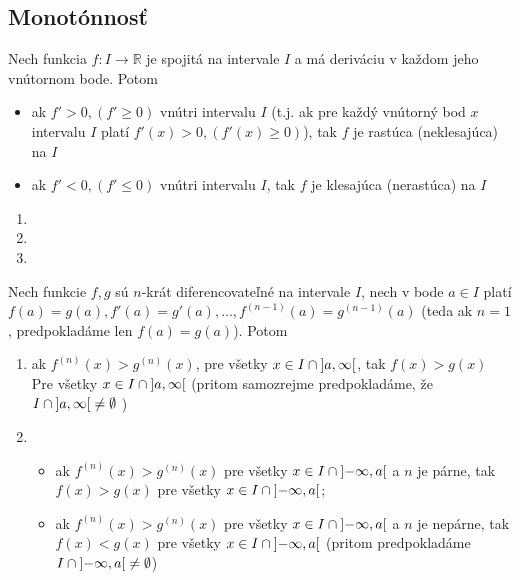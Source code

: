\subsection{Monotónnosť}
\begin{veta}
Nech funkcia $f: I \rightarrow\mathbb{R}$ je spojitá na intervale $I$ a má
deriváciu v každom jeho vnútornom bode. Potom
\begin{itemize}
\item
  ak $f'>0,(f'\geq 0)$ vnútri intervalu $I$ (t.j. ak pre každý vnútorný bod
  $x$ intervalu $I$ platí $f'(x)>0,(f'(x)\geq 0)$), tak $f$ je rastúca
  (neklesajúca) na $I$
\item
  ak $f'<0,(f'\leq 0)$ vnútri intervalu $I$, tak $f$ je klesajúca (nerastúca) na
  $I$
\end{itemize}
\end{veta}

\begin{enumerate}[resume]
  \item {}
  \item {}
  \item {}
\end{enumerate}

\begin{veta}
Nech funkcie $f,g$ sú $n$-krát diferencovateľné na intervale $I$, nech v bode
$a\in I$ platí $f(a)=g(a),f'(a)=g'(a),...,f^{(n-1)}(a)=g^{(n-1)}(a)$ (teda ak
$n=1$, predpokladáme len $f(a)=g(a)$). Potom
\begin{enumerate}
\item
  ak $f^{(n)}(x)>g^{(n)}(x)$, pre všetky $x\in I \cap \interval[open]{a}{\infty}$, tak
  $f(x)>g(x)$ Pre všetky $x\in I \cap \interval[open]{a}{\infty}$ (pritom samozrejme
  predpokladáme, že $I \cap \interval[open]{a}{\infty} \neq \emptyset$ )
\item
  \begin{itemize}
    \item
      ak $f^{(n)}(x)>g^{(n)}(x)$ pre všetky $x\in I \cap
      \interval[open]{-\infty}{a}$ a $n$ je párne, tak $f(x)>g(x)$ pre všetky
      $x\in I \cap \interval[open]{-\infty}{a}$;
    \item
      ak $f^{(n)}(x)>g^{(n)}(x)$ pre všetky $x\in I \cap
      \interval[open]{-\infty}{a}$ a $n$ je nepárne, tak $f(x)<g(x)$ pre všetky
      $x\in I \cap \interval[open]{-\infty}{a}$ (pritom predpokladáme $I \cap
      \interval[open]{-\infty}{a}\neq \emptyset$)
  \end{itemize}
\end{enumerate}
\end{veta}

